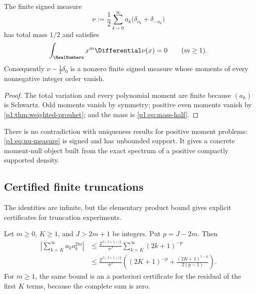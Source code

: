 \documentclass[11pt,oneside]{article}
\theoremstyle{definition}
\theoremstyle{remark}
\begin{document}
\begin{corollary}\label{p1:cor:moment-null-measure}
The finite signed measure
\begin{equation}\label{p1:eq:nu-measure}
 \nu:=\frac12\sum_{k=0}^{\infty}a_k
 \bigl(\delta_{o_k}+\delta_{-o_k}\bigr)
\end{equation}
has total mass $1/2$ and satisfies
\begin{equation}\label{p1:eq:nu-moments}
 \int_{\RealNumbers}x^m\Differential\nu(x)=0\qquad(m\ge1).
\end{equation}
Consequently $\nu-\tfrac12\delta_0$ is a nonzero finite signed measure whose
moments of every nonnegative integer order vanish.
\end{corollary}

\begin{proof}
The total variation and every polynomial moment are finite because $(a_k)$ is
Schwartz.  Odd moments vanish by symmetry; positive even moments vanish by
\cref{p1:thm:weighted-prouhet}; and the mass is \eqref{p1:eq:mass-half}.
\end{proof}

\begin{remark}
There is no contradiction with uniqueness results for positive moment problems:
\eqref{p1:eq:nu-measure} is signed and has unbounded support.  It gives a concrete
moment-null object built from the exact spectrum of a positive compactly
supported density.
\end{remark}

\subsection{Certified finite truncations}

The identities are infinite, but the elementary product bound gives explicit
certificates for truncation experiments.

\begin{proposition}\label{p1:prop:prouhet-tail}
Let $m\ge0$, $K\ge1$, and $J>2m+1$ be integers.  Put $p=J-2m$.  Then
\begin{align}
 \left|\sum_{k=K}^{\infty}a_ko_k^{2m}\right|
 &\le \frac{2^{J(J+1)/2}}{\pi^J}
 \sum_{k=K}^{\infty}(2k+1)^{-p}
 \label{p1:eq:prouhet-tail-raw}\\
 &\le \frac{2^{J(J+1)/2}}{\pi^J}
 \left((2K+1)^{-p}
 +\frac{(2K+1)^{1-p}}{2(p-1)}\right).
 \label{p1:eq:prouhet-tail-explicit}
\end{align}
For $m\ge1$, the same bound is an a posteriori certificate for the residual of
the first $K$ terms, because the complete sum is zero.
\end{proposition}
\end{document}
